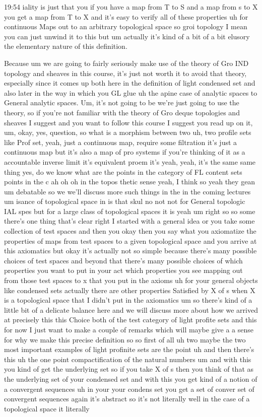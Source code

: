 \begin{unfinished}{19:54}
iality is just that you if you have a map from T to S and a map from s to X you get a map from T to X and it's easy to verify all of these properties uh for continuous Maps out to an arbitrary topological space so groi topology I mean you can just unwind it to this but um actually it's kind of a bit of a bit elusory the elementary nature of this definition.

Because um we are going to fairly seriously make use of the theory of Gro IND topology and sheaves in this course, it's just not worth it to avoid that theory, especially since it comes up both here in the definition of light condensed set and also later in the way in which you GL glue uh the apine case of analytic spaces to General analytic spaces. Um, it's not going to be we're just going to use the theory, so if you're not familiar with the theory of Gro deque topologies and sheaves I suggest and you want to follow this course I suggest you read up on it, um, okay, yes, question, so what is a morphism between two uh, two profile sets like Prof set, yeah, just a continuous map, require some filtration it's just a continuous map but it's also a map of pro systems if you're thinking of it as a accountable inverse limit it's equivalent proem it's yeah, yeah, it's the same same thing yes, do we know what are the points in the category of FL content sets points in the c ah oh oh in the topos thetic sense yeah, I think so yeah they gean um debatable so we we'll discuss more such things in the in the coming lectures um isance of topological space in is that skul no not not for General topologic IAL spes but for a large class of topological spaces it is yeah um right so so some there's one thing that's clear right I started with a general idea or you take some collection of test spaces and then you okay then you say what you axiomatize the properties of maps from test spaces to a given topological space and you arrive at this axiomatics but okay it's actually not so simple because there's many possible choices of test spaces and beyond that there's many possible choices of which properties you want to put in your act which properties you see mapping out from those test spaces to x that you put in the axioms uh for your general objects like condensed sets actually there are other properties Satisfied by X of s when X is a topological space that I didn't put in the axiomatics um so there's kind of a little bit of a delicate balance here and we will discuss more about how we arrived at precisely this this Choice both of the test category of light profite sets and this for now I just want to make a couple of remarks which will maybe give a a sense for why we make this precise definition so so first of all uh two maybe the two most important examples of light profinite sets are the point uh and then there's this uh the one point compactification of the natural numbers um and with this you kind of get the underlying set so if you take X of s then you think of that as the underlying set of your condensed set and with this you get kind of a notion of a convergent sequences uh in your your condens set you get a set of conver set of convergent sequences again it's abstract so it's not literally well in the case of a topological space it literally 
\end{unfinished}
